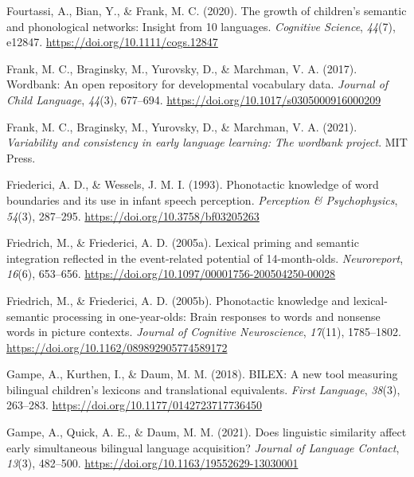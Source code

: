 \documentclass[
  12pt,
  b5paperpaper,
  twoside]{scrreprt}
\newlength{\cslhangindent}
\newlength{\cslentryspacingunit} %
\newenvironment{CSLReferences}[2] %
 {%
  \setlength{\parindent}{0pt}
  \ifodd #1
  \let\oldpar\par
  \def\par{\hangindent=\cslhangindent\oldpar}
  \fi
  \setlength{\parskip}{#2\cslentryspacingunit}
 }%
 {}
\begin{document}
\begin{CSLReferences}{1}{0}
\leavevmode{}%
Fourtassi, A., Bian, Y., \& Frank, M. C. (2020). The growth of
children's semantic and phonological networks: Insight from 10
languages. \emph{Cognitive Science}, \emph{44}(7), e12847.
\url{https://doi.org/10.1111/cogs.12847}

\leavevmode{}%
Frank, M. C., Braginsky, M., Yurovsky, D., \& Marchman, V. A. (2017).
Wordbank: An open repository for developmental vocabulary data.
\emph{Journal of Child Language}, \emph{44}(3), 677--694.
\url{https://doi.org/10.1017/s0305000916000209}

\leavevmode{}%
Frank, M. C., Braginsky, M., Yurovsky, D., \& Marchman, V. A. (2021).
\emph{Variability and consistency in early language learning: The
wordbank project}. {MIT Press}.

\leavevmode{}%
Friederici, A. D., \& Wessels, J. M. I. (1993). Phonotactic knowledge of
word boundaries and its use in infant speech perception.
\emph{Perception \& Psychophysics}, \emph{54}(3), 287--295.
\url{https://doi.org/10.3758/bf03205263}

\leavevmode{}%
Friedrich, M., \& Friederici, A. D. (2005a). Lexical priming and
semantic integration reflected in the event-related potential of
14-month-olds. \emph{Neuroreport}, \emph{16}(6), 653--656.
\url{https://doi.org/10.1097/00001756-200504250-00028}

\leavevmode{}%
Friedrich, M., \& Friederici, A. D. (2005b). Phonotactic knowledge and
lexical-semantic processing in one-year-olds: Brain responses to words
and nonsense words in picture contexts. \emph{Journal of Cognitive
Neuroscience}, \emph{17}(11), 1785--1802.
\url{https://doi.org/10.1162/089892905774589172}

\leavevmode{}%
Gampe, A., Kurthen, I., \& Daum, M. M. (2018). {BILEX}: A new tool
measuring bilingual children's lexicons and translational equivalents.
\emph{First Language}, \emph{38}(3), 263--283.
\url{https://doi.org/10.1177/0142723717736450}

\leavevmode{}%
Gampe, A., Quick, A. E., \& Daum, M. M. (2021). Does linguistic
similarity affect early simultaneous bilingual language acquisition?
\emph{Journal of Language Contact}, \emph{13}(3), 482--500.
\url{https://doi.org/10.1163/19552629-13030001}


\end{CSLReferences}
\end{document}
